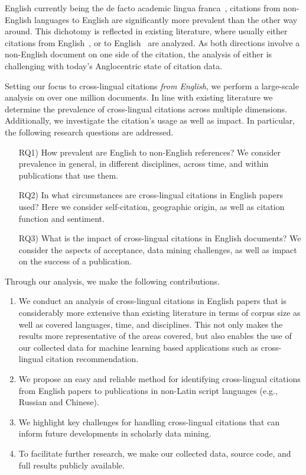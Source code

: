 English currently being the de facto academic lingua franca~\cite{Montgomery2013}, citations from non-English languages to English are significantly more prevalent than the other way around. This dichotomy is reflected in existing literature, where usually either citations from English~\cite{Kellsey2004,Lillis2010}, or to English~\cite{Tang2014,Jiang2018,Jiang2018b,Schrader2019} are analyzed. As both directions involve a non-English document on one side of the citation, the analysis of either is challenging with today's Anglocentric state of citation data.

Setting our focus to cross-lingual citations \emph{from English}, we perform a large-scale analysis on over one million documents.
In line with existing literature we determine the prevalence of cross-lingual citations across multiple dimensions. Additionally, we investigate the citation's usage as well as impact. In particular, the following research questions are addressed.

\begin{enumerate}[align=left]
\item[RQ1)] How prevalent are English to non-English references? We consider prevalence in general, in different disciplines, across time, and within publications that use them.
\item[RQ2)] In what circumstances are cross-lingual citations in English papers used? Here we consider self-citation, geographic origin, as well as citation function and sentiment.
\item[RQ3)] What is the impact of cross-lingual citations in English documents? We consider the aspects of acceptance, data mining challenges, as well as impact on the success of a publication.
\end{enumerate}

\noindent Through our analysis, we make the following contributions.

\begin{enumerate}
\item We conduct an analysis of cross-lingual citations in English papers that is considerably more extensive than existing literature in terms of corpus size as well as covered languages, time, and disciplines. This not only makes the results more representative of the areas covered, but also enables the use of our collected data for machine learning based applications such as cross-lingual citation recommendation.
\item We propose an easy and reliable method for identifying cross-lingual citations from English papers to publications in non-Latin script languages (e.g., Russian and Chinese).
\item We highlight key challenges for handling cross-lingual citations that can inform future developments in scholarly data mining.
\item To facilitate further research, we make our collected data, source code, and full results publicly available.
\end{enumerate}

